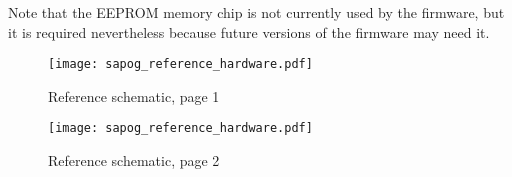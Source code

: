 \documentclass{zubaxdoc}
\begin{document}
Note that the EEPROM memory chip is not currently used by the firmware,
but it is required nevertheless because future versions of the firmware may need it.

\begin{figure}[hbt]
	\centering
	\texttt{[image: sapog\_reference\_hardware.pdf]}
	\caption{Reference schematic, page 1}
\end{figure}

\begin{figure}[hbt]
	\centering
	\texttt{[image: sapog\_reference\_hardware.pdf]}
	\caption{Reference schematic, page 2}
\end{figure}
\end{document}
